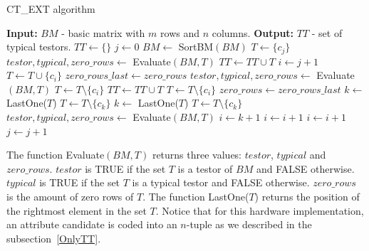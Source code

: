 \documentclass[authoryear,11pt]{elsarticle}
\begin{document}
	\begin{algorithm}
	\begin{spacing}{1.0}
	\begin{small}
	\caption{CT\_EXT algorithm}\label{ctext_algo}
	\begin{algorithmic}[1]
	\State \textbf{Input: } $BM$ - basic matrix with $m$ rows and $n$ columns.
	\State \textbf{Output: } $TT$ - set of typical testors.
	\State $TT \gets \{\}$
	\State $j \gets 0$ 
	\State $BM \gets$ SortBM$(BM)$
	\label{row1condition}
	\State $T \gets \{c_j\}$ 
	\State $testor, typical, zero\_rows \gets$ Evaluate$(BM,T)$
	 
	\State $TT \gets TT \cup T$
	\EndIf
	\Else
	\State $i \gets j+1$
	\State $T \gets T \cup \{c_i\}$
	\State $zero\_rows\_last \gets zero\_rows$
	\State $testor, typical, zero\_rows \gets$ Evaluate$(BM,T)$
	\State $T \gets T \setminus \{c_i\}$ 
	\Else
	 
	\State $TT \gets TT \cup T$
	\EndIf
	\State $T \gets T \setminus \{c_i\}$
	\State $zero\_rows \gets zero\_rows\_last$
	\EndIf
	\EndIf
	\State $k \gets$ LastOne($T$)
	\State $T \gets T \setminus \{c_k\}$
	\State $k \gets$ LastOne($T$)
	\EndIf
	\State $T \gets T \setminus \{c_k\}$
	\State $testor, typical, zero\_rows \gets$ Evaluate$(BM,T)$
	\State $i \gets k+1$
	\Else
	\State $i \gets i+1$
	\EndIf
	\Else
	\State $i \gets i+1$
	\EndIf
	\EndWhile
	\EndIf
	\State $j \gets j+1$
	\EndWhile
	\end{algorithmic}
	\end{small}
	\end{spacing}
	\end{algorithm}
	
	The function Evaluate$(BM,T)$ returns three values: $testor$, $typical$ and $zero\_rows$. $testor$ is 
	TRUE if the set $T$ is a testor of $BM$ and FALSE otherwise. $typical$ is TRUE if the set $T$ is a
	typical testor and FALSE otherwise. $zero\_rows$ is the amount of zero rows of $T$. The function
	LastOne($T$) returns the position of the rightmost element in the set $T$. Notice that for this hardware
	implementation, an attribute candidate is coded into an $n$-tuple as we described in the
	subsection~\ref{OnlyTT}.
	
\end{document}
